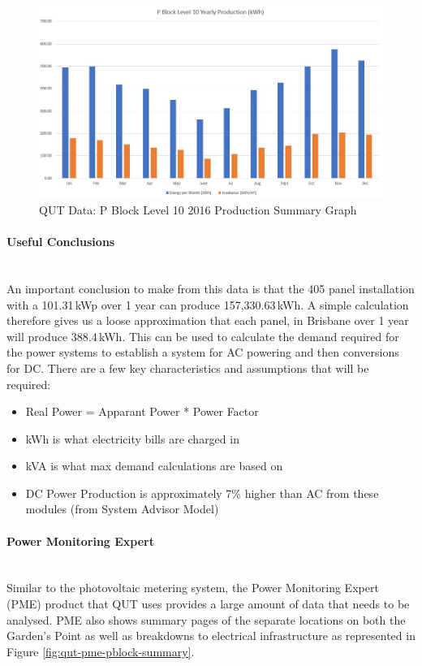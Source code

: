 \begin{figure}[H]
	\hfill\includegraphics[width = 150mm]{images/metering/meteo/p-block-lvl10-yearly-production}\hspace*{\fill}
	\caption{QUT Data: P Block Level 10 2016 Production Summary Graph} 
	\label{fig:qut-pv-lvl10-2016}
\end{figure}  

\paragraph{Useful Conclusions}
~\\
An important conclusion to make from this data is that the 405 panel installation with a 101.31\,kWp over 1 year can produce 157,330.63\,kWh. A simple calculation therefore gives us a loose approximation that each panel, in Brisbane over 1 year will produce 388.4\,kWh. This can be used to calculate the demand required for the power systems to establish a system for AC powering and then conversions for DC. There are a few key characteristics and assumptions that will be required:
\newline
\begin{itemize}[noitemsep,nolistsep]
	\item Real Power = Apparant Power * Power Factor
	\item kWh is what electricity bills are charged in
	\item kVA is what max demand calculations are based on
	\item DC Power Production is approximately 7\% higher than AC from these modules (from System Advisor Model)
\end{itemize} 

\newpage

\paragraph{Power Monitoring Expert}
~~\\
Similar to the photovoltaic metering system, the Power Monitoring Expert (PME) product that QUT uses provides a large amount of data that needs to be analysed. PME also shows summary pages of the separate locations on both the Garden's Point as well as breakdowns to electrical infrastructure as represented in Figure \ref{fig:qut-pme-pblock-summary}. 

